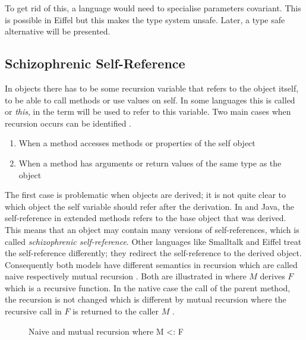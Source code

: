 To get rid of this, a language would need to specialise parameters
covariant. This is possible in Eiffel but this makes the type system
unsafe. Later, a type safe alternative will be presented.

\subsection{Schizophrenic Self-Reference}
\label{sec:schizoReferences}
In objects there has to be some recursion variable that refers to the
object itself, to be able to call methods or use values on self. In some
languages this is called \self or \emph{this}, in \ooplss
the term \self will be used to refer to this variable. Two main cases when
recursion occurs can be identified \cite{simons_theory_2003-2}.

\begin{enumerate}
	\item When a method accesses methods or properties of the self object
	\item When a method has arguments or return values of the same type as the object
\end{enumerate}

The first case is problematic when objects are derived; it is not
quite clear to which object the self variable should refer after
the derivation. In \cpp and Java, the self-reference in extended
methods refers to the base object that was derived. This means that an
object may contain many versions of self-references, which is called
\emph{schizophrenic self-reference}. Other languages like Smalltalk
and Eiffel treat the self-reference differently; they redirect the
self-reference to the derived object. Consequently both models have
different semantics in recursion which are called naive respectively
mutual recursion \cite{cook_denotational_1989}. Both are illustrated
in  where $M$ derives $F$ which is a recursive
function. In the native case the call of the parent method, the recursion
is not changed which is different by mutual recursion where the recursive
call in $F$ is returned to the caller $M$ \cite{simons_theory_2003-2}.

\begin{figure}
	\centering
	\caption[Naive and mutual recursion where M <: F]{Naive and mutual recursion where M <: F \cite{cook_denotational_1989}}
	\label{fig:schizoRecursion}
\end{figure}

